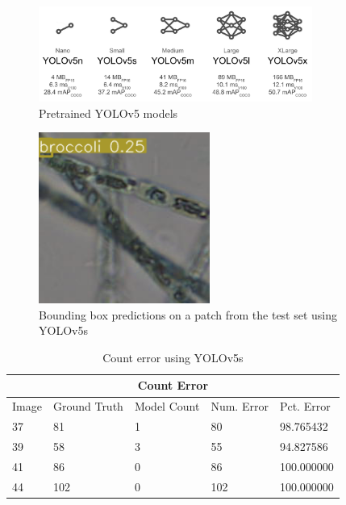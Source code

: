 \begin{figure}[h!]
	\centering
	\includegraphics[width=0.8\textwidth]{images/04Implementation/model_comparison.png}
	\caption{Pretrained YOLOv5 models}
    \label{model_comparison}
\end{figure}

\begin{figure}[h!]
	\centering
	\includegraphics[width=0.5\textwidth]{images/03Design/broc.png}
	\caption{Bounding box predictions on a patch from the test set using YOLOv5s}
    \label{broc}
\end{figure}

\begin{table}
\centering
\begin{tabular}{ |l||l|l|l|l|  }
\hline
\multicolumn{5}{|c|}{Count Error} \\
\hline
Image & Ground Truth & Model Count & Num. Error & Pct. Error \\
\hline
37 &            81 &            1 &          80 &   98.765432 \\
39 &            58 &            3 &          55 &   94.827586 \\
41 &            86 &            0 &          86 &  100.000000 \\
44 &           102 &            0 &         102 &  100.000000 \\
\hline
\end{tabular}
\caption{Count error using YOLOv5s}
\label{yolov5s_counts}
\end{table}

